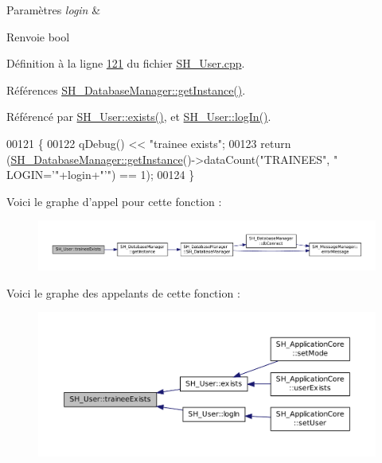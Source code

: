 \begin{DoxyParams}{Paramètres}
{\em login} & \\
\hline
\end{DoxyParams}
\begin{DoxyReturn}{Renvoie}
bool 
\end{DoxyReturn}


Définition à la ligne \hyperlink{SH__User_8cpp_source_l00121}{121} du fichier \hyperlink{SH__User_8cpp_source}{S\-H\-\_\-\-User.\-cpp}.



Références \hyperlink{classSH__DatabaseManager_a31198eb4de0f8b18e3fa0eed09f24d19}{S\-H\-\_\-\-Database\-Manager\-::get\-Instance()}.



Référencé par \hyperlink{classSH__User_aeefcf386df717163d07e17c48205814b}{S\-H\-\_\-\-User\-::exists()}, et \hyperlink{classSH__User_a98e3e3ca706a6988e6d7af23ce8bb82a}{S\-H\-\_\-\-User\-::log\-In()}.


\begin{DoxyCode}
00121                                          \{
00122     qDebug() << \textcolor{stringliteral}{"trainee exists"};
00123     \textcolor{keywordflow}{return} (\hyperlink{classSH__DatabaseManager_a31198eb4de0f8b18e3fa0eed09f24d19}{SH\_DatabaseManager::getInstance}()->dataCount(\textcolor{stringliteral}{"TRAINEES"}, \textcolor{stringliteral}{"
      LOGIN='"}+login+\textcolor{stringliteral}{"'"}) == 1);
00124 \}
\end{DoxyCode}


Voici le graphe d'appel pour cette fonction \-:\nopagebreak
\begin{figure}[H]
\begin{center}
\leavevmode
\includegraphics[width=350pt]{classSH__User_adfc35c967cb405f4a14886676612fbb7_cgraph}
\end{center}
\end{figure}




Voici le graphe des appelants de cette fonction \-:\nopagebreak
\begin{figure}[H]
\begin{center}
\leavevmode
\includegraphics[width=350pt]{classSH__User_adfc35c967cb405f4a14886676612fbb7_icgraph}
\end{center}
\end{figure}


